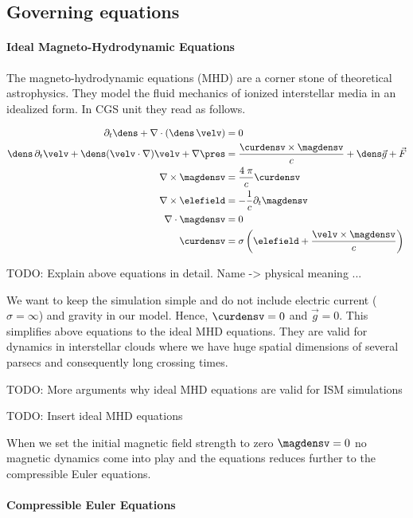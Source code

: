 \subsection{Governing equations}

\paragraph{Ideal Magneto-Hydrodynamic Equations}
The magneto-hydrodynamic equations (MHD) are a corner stone of theoretical
astrophysics.  They model the fluid mechanics of ionized interstellar media in
an idealized form. In CGS unit they read as follows.

\begin{align}
\partial_t\dens + \nabla \cdot (\dens\,\velv)   &=  0 \\
\dens\, \partial_t \velv + \dens(\velv \cdot \nabla) \velv + \nabla \pres &= \frac{\curdensv \times \magdensv}{c} + \dens \vec{g} + \vec{F} \\
\nabla \times \magdensv &= \frac{4\;\pi}{c} \curdensv \\
\nabla \times \elefield &= -\frac{1}{c} \partial_t \magdensv \\
\nabla \cdot  \magdensv &= 0 \\
\curdensv               &= \sigma \left ( \elefield + \frac{\velv \times \magdensv}{c} \right )
\end{align}

TODO: Explain above equations in detail. Name -> physical meaning ...

We want to keep the simulation simple and do not include electric current
($\sigma = \infty$) and gravity in our model. Hence, $\curdensv = 0$ and
$\vec{g} = 0$. This simplifies above equations to the ideal MHD equations.
They are valid for dynamics in interstellar clouds where we have huge
spatial dimensions of several parsecs and consequently long crossing times.

TODO: More arguments why ideal MHD equations are valid for ISM simulations

TODO: Insert ideal MHD equations

When we set the initial magnetic field strength to zero $\magdensv = 0$ no
magnetic dynamics come into play and the equations reduces further to the
compressible Euler equations.

\paragraph{Compressible Euler Equations}

